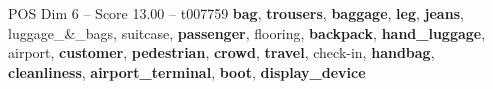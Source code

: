 \begin{textsample}{POS Dim 6 – Score 13.00 – t007759}  \label{ex:f6_pos_020}
\textbf{bag}, \textbf{trousers}, \textbf{baggage}, \textbf{leg}, \textbf{jeans}, luggage\_\&\_bags, suitcase, \textbf{passenger}, flooring, \textbf{backpack}, \textbf{hand\_luggage}, airport, \textbf{customer}, \textbf{pedestrian}, \textbf{crowd}, \textbf{travel}, check-in, \textbf{handbag}, \textbf{cleanliness}, \textbf{airport\_terminal}, \textbf{boot}, \textbf{display\_device}

\end{textsample}
